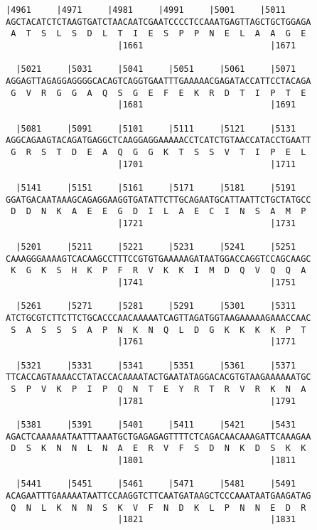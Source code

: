 \documentclass{article}
\begin{document}
\newpage
\begin{Verbatim}[fontfamily=courier]
  |4961     |4971     |4981     |4991     |5001     |5011   
AGCTACATCTCTAAGTGATCTAACAATCGAATCCCCTCCAAATGAGTTAGCTGCTGGAGA
 A  T  S  L  S  D  L  T  I  E  S  P  P  N  E  L  A  A  G  E 
                      |1661                         |1671   

  |5021     |5031     |5041     |5051     |5061     |5071   
AGGAGTTAGAGGAGGGGCACAGTCAGGTGAATTTGAAAAACGAGATACCATTCCTACAGA
 G  V  R  G  G  A  Q  S  G  E  F  E  K  R  D  T  I  P  T  E 
                      |1681                         |1691   

  |5081     |5091     |5101     |5111     |5121     |5131   
AGGCAGAAGTACAGATGAGGCTCAAGGAGGAAAAACCTCATCTGTAACCATACCTGAATT
 G  R  S  T  D  E  A  Q  G  G  K  T  S  S  V  T  I  P  E  L 
                      |1701                         |1711   

  |5141     |5151     |5161     |5171     |5181     |5191   
GGATGACAATAAAGCAGAGGAAGGTGATATTCTTGCAGAATGCATTAATTCTGCTATGCC
 D  D  N  K  A  E  E  G  D  I  L  A  E  C  I  N  S  A  M  P 
                      |1721                         |1731   

  |5201     |5211     |5221     |5231     |5241     |5251   
CAAAGGGAAAAGTCACAAGCCTTTCCGTGTGAAAAAGATAATGGACCAGGTCCAGCAAGC
 K  G  K  S  H  K  P  F  R  V  K  K  I  M  D  Q  V  Q  Q  A 
                      |1741                         |1751   

  |5261     |5271     |5281     |5291     |5301     |5311   
ATCTGCGTCTTCTTCTGCACCCAACAAAAATCAGTTAGATGGTAAGAAAAAGAAACCAAC
 S  A  S  S  S  A  P  N  K  N  Q  L  D  G  K  K  K  K  P  T 
                      |1761                         |1771   

  |5321     |5331     |5341     |5351     |5361     |5371   
TTCACCAGTAAAACCTATACCACAAAATACTGAATATAGGACACGTGTAAGAAAAAATGC
 S  P  V  K  P  I  P  Q  N  T  E  Y  R  T  R  V  R  K  N  A 
                      |1781                         |1791   

  |5381     |5391     |5401     |5411     |5421     |5431   
AGACTCAAAAAATAATTTAAATGCTGAGAGAGTTTTCTCAGACAACAAAGATTCAAAGAA
 D  S  K  N  N  L  N  A  E  R  V  F  S  D  N  K  D  S  K  K 
                      |1801                         |1811   

  |5441     |5451     |5461     |5471     |5481     |5491   
ACAGAATTTGAAAAATAATTCCAAGGTCTTCAATGATAAGCTCCCAAATAATGAAGATAG
 Q  N  L  K  N  N  S  K  V  F  N  D  K  L  P  N  N  E  D  R 
                      |1821                         |1831   

\end{Verbatim}
\end{document}
